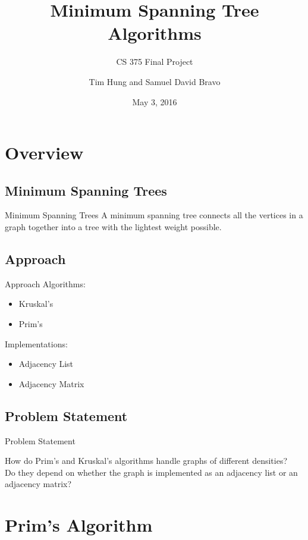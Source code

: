 \documentclass{beamer}
\title{Minimum Spanning Tree Algorithms}
\subtitle{CS 375 Final Project}
\author{Tim Hung and Samuel David Bravo}
\institute{Binghamton University}
\date{May 3, 2016}
\begin{document}
\frame{\titlepage}
\section{Overview}\frame{\sectionpage}

\subsection{Minimum Spanning Trees}
\begin{frame}{Minimum Spanning Trees}
    A minimum spanning tree connects all the vertices in a graph together into
    a tree with the lightest weight possible.
\end{frame}

\subsection{Approach}
\begin{frame}{Approach}
    Algorithms:

        \begin{itemize}
        \item Kruskal's
        \item Prim's
        \end{itemize}

    Implementations:

        \begin{itemize}
        \item Adjacency List
        \item Adjacency Matrix
        \end{itemize}
\end{frame}

\subsection{Problem Statement}
\begin{frame}{Problem Statement}
    \begin{center}
    How do Prim's and Kruskal's algorithms handle graphs of different
    densities?\\
    \bigskip
    Do they depend on whether the graph is implemented as an 
    adjacency list or an adjacency matrix?
    \end{center}
\end{frame}


\section{Prim's Algorithm}\frame{\sectionpage}
\end{document}
